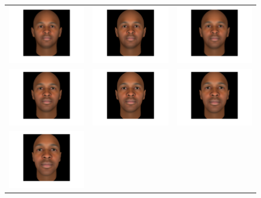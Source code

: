 \documentclass[runningheads]{llncs}
\begin{document}
\begin{figure}[ht]
\centering
\begin{tabular}{ccc}
\includegraphics[width=.25\linewidth]{resources/figures/extracted_fiducial_0006.png} &
\includegraphics[width=.25\linewidth]{resources/figures/extracted_fiducial_0008.png} &
\includegraphics[width=.25\linewidth]{resources/figures/extracted_fiducial_0001.png} \\
\includegraphics[width=.25\linewidth]{resources/figures/extracted_fiducial_0002.png} &
\includegraphics[width=.25\linewidth]{resources/figures/extracted_fiducial_0003.png} &
\includegraphics[width=.25\linewidth]{resources/figures/extracted_fiducial_0004.png} \\
\includegraphics[width=.25\linewidth]{resources/figures/extracted_fiducial_0005.png} &

\end{tabular}
\end{figure}
\end{document}
